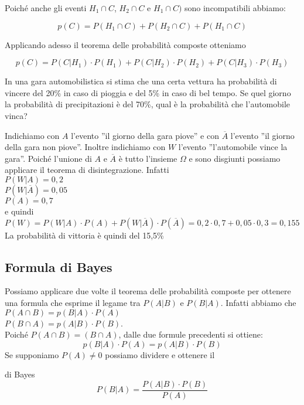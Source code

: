 Poiché anche gli eventi $H_1 \cap C$, $H_2 \cap C$ e $H_1 \cap C)$ sono 
incompatibili abbiamo:

$$p(C)=P(H_1 \cap C)+P(H_2 \cap C) + P(H_1 \cap C)$$

Applicando adesso il teorema delle probabilità composte otteniamo

$$p(C)=P(C|H_1)\cdot P(H_1)+P(C|H_2)\cdot P(H_2)+P(C|H_3)\cdot P(H_3)$$
\begin{exrig}
\begin{esempio}
In una gara automobilistica si stima che una certa vettura ha probabilità di 
vincere del 20\% in caso di pioggia e del 5\% in caso di bel tempo. Se quel 
giorno la probabilità di precipitazioni è del 70\%, qual è la probabilità che 
l'automobile vinca?

Indichiamo con $A$ l'evento ''il giorno della gara piove'' e con $\overline A$ 
l'evento ''il giorno della gara non piove''. Inoltre indichiamo con $W$ 
l'evento ''l'automobile vince la gara''. Poiché l'unione di $A$ e $\overline A$ 
è tutto l'insieme $\Omega$ e sono disgiunti possiamo applicare il teorema di 
disintegrazione. Infatti\\
$P(W|A)=0,2$\\
$P(W|\overline A)=0,05$\\
$P(A)=0,7$\\
e quindi\\
$P(W)=P(W|A)\cdot P(A) + P(W|\overline A)\cdot P(\overline A)=0,2 \cdot 0,7 + 
0,05 \cdot 0,3 = 0,155$\\
La probabilità di vittoria è quindi del 15,5\%
\end{esempio}
\end{exrig}

\subsection{Formula di Bayes}
Possiamo applicare due volte il teorema delle probabilità composte per ottenere 
una formula che esprime il legame tra $P(A|B)$ e $P(B|A)$.
Infatti abbiamo che \\
$P(A\cap B)=p(B|A)\cdot P(A)$ \\
$P(B\cap A)=p(A|B)\cdot P(B)$.\\
Poiché $P(A\cap B) = (B\cap A)$, dalle due formule precedenti si ottiene:
$$p(B|A)\cdot P(A) = p(A|B)\cdot P(B)$$
Se supponiamo $P(A) \neq 0$ possiamo dividere e ottenere il
\begin{teorema}{di Bayes}
$$P(B|A)=\dfrac{P(A|B)\cdot P(B)}{P(A)}$$ 
\end{teorema} 


